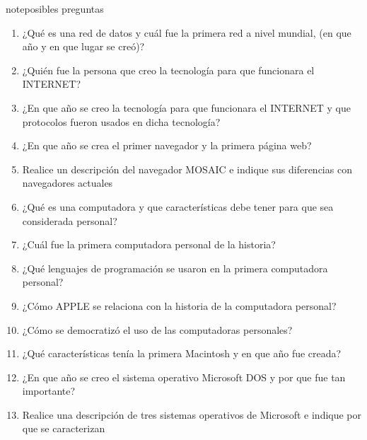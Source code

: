 \documentclass[letterpaper,10pt,spanish]{sphinxmanual}
\begin{document}
\begin{sphinxadmonition}{note}{posibles preguntas}
\begin{enumerate}
%
\item {} 
\sphinxAtStartPar
¿Qué es una red de datos y cuál fue la primera red a nivel mundial, (en que año y en que lugar se creó)?

\item {} 
\sphinxAtStartPar
¿Quién fue la persona que creo la tecnología para que funcionara el INTERNET?

\item {} 
\sphinxAtStartPar
¿En que año se creo la tecnología para que funcionara el INTERNET y que protocolos fueron usados en dicha tecnología?

\item {} 
\sphinxAtStartPar
¿En que año se crea el primer navegador y la primera página web?

\item {} 
\sphinxAtStartPar
Realice un descripción del navegador MOSAIC e indique sus diferencias con navegadores actuales

\item {} 
\sphinxAtStartPar
¿Qué es una computadora y que características debe tener para que sea considerada personal?

\item {} 
\sphinxAtStartPar
¿Cuál fue la primera computadora personal de la historia?

\item {} 
\sphinxAtStartPar
¿Qué lenguajes de programación se usaron en la primera computadora personal?

\item {} 
\sphinxAtStartPar
¿Cómo APPLE se relaciona con la historia de la computadora personal?

\item {} 
\sphinxAtStartPar
¿Cómo se democratizó el uso de las computadoras personales?

\item {} 
\sphinxAtStartPar
¿Qué características tenía la primera Macintosh y en que año fue creada?

\item {} 
\sphinxAtStartPar
¿En que año se creo el sistema operativo Microsoft DOS y por que fue tan importante?

\item {} 
\sphinxAtStartPar
Realice una descripción de tres sistemas operativos de Microsoft e indique por que se caracterizan


\end{enumerate}
\end{sphinxadmonition}
\end{document}
